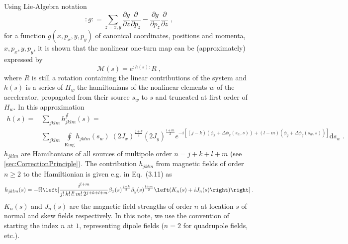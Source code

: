 Using Lie-Algebra notation~\cite{DragtLieSeriesInvariant1976, DragtLieAlgebraicTheory1982}
%
\begin{equation}
    \label{eq:LieOperator}
    :g: = \sum\limits_{z=x,y} \frac{\partial g}{\partial z} \frac{\partial }{\partial p_z} - \frac{\partial g}{\partial p_z} \frac{\partial }{\partial z} \;,
\end{equation}
%
for a function $g(x, p_x, y, p_y)$ of canonical coordinates, positions and momenta, $x, p_x, y, p_y$,
it is shown that the nonlinear one-turn map can be (approximately) expressed by
\begin{equation}
    \label{eq:OTMNormalized}
    \mathcal{M}(s) = e^{:h(s):}R  \; ,
\end{equation}
%
where $R$ is still a rotation containing the linear contributions of the system and $h(s)$
is a series of $H_w$ the hamiltonians of the nonlinear elements $w$ of the accelerator, 
propagated from their source $s_w$ to $s$ and truncated at first order of $H_w$.
In this approximation
%
\begin{equation}
    \label{eq:hamiltonianTwissCoordinates}
    \begin{split}
    h(s) =   &\sum\limits_{jklm} h^{\oint}_{jklm}(s) = \\ 
    &\sum\limits_{jklm} \; 
    \oint\limits_{\text{Ring}} h_{jklm}(s_w) \; (2J_x)^{\frac{j+k}{2}}(2J_y)^{\frac{l+m}{2}} 
    e^{-i\left[(j-k)(\phi_x + \Delta \phi_x(s_w, s)) + (l-m)(\phi_y + \Delta \phi_{y}(s_w, s))\right]} \mathrm{d}s_w \; .
    \end{split}
\end{equation}
%
$h_{jklm}$ are Hamiltonians of all sources of multipole order $n = j + k + l + m$ (see \cref{sec:CorrectionPrinciple}).
The contribution $h_{jklm}$ from magnetic fields of order $n \geq 2$ to the Hamiltionian is given 
e.g. in \cite{FranchiStudiesMeasurementsLinear2006} Eq.~(3.11) as 
%
\begin{equation}
    \label{eq:HamiltonianTermsMultipoleSources}
    h_{jklm}(s) = 
    -\ReOf{    
     \frac{i^{l+m}}{j! \, k! \, l! \, m! \, 2^{j+k+l+m}}
    \beta_x(s)^{\frac{j+k}{2}}\beta_y(s)^{\frac{l+m}{2}} 
    \left(K_{n}(s) + iJ_{n}(s)\right)
     } \; .
\end{equation}
%
$K_n(s)$ and $J_n(s)$ are the magnetic field strengths of order $n$ at location $s$ of normal and skew fields respectively.
In this note, we use the convention of starting the index $n$ at $1$, representing dipole fields 
($n=2$ for quadrupole fields, etc.).

